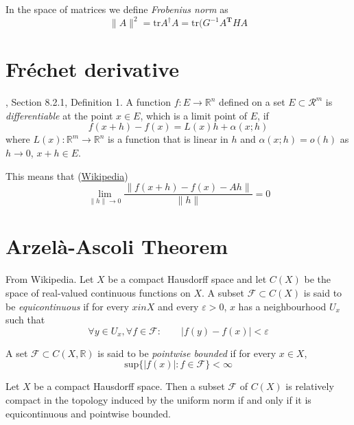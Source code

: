 \begin{definition}
\label{definition-Frobenius-norm}
In the space of matrices we define {\it Frobenius norm} as
\begin{equation}
\label{equation-Frobenius-norm}
\|A\|^2=\text{tr}A^\dag A=\text{tr}(G^{-1}A^{\mathbf{T}}HA
\end{equation}
\end{definition}

\section{Fréchet derivative}
\label{section-Fréchet-derivative}

\begin{definition}
\label{definition-Frechet-derivative}
\cite{zo1}, Section 8.2.1, Definition 1. A function $f:E \to \mathbb{R}^n$
defined on a set $E \subset \mathcal{R}^m$ is {\it differentiable} at the point
$x \in E$, which is a limit point of $E$, if
$$
f(x+h)-f(x)=L(x)h+\alpha(x;h)
$$
where $L(x):\mathbb{R}^m\to \mathbb{R}^n$ is a function that is linear in $h$
and $\alpha(x;h)=o(h)$ as $h\to 0$, $x+h\in E$.
\end{definition}

This means that (\href{Alguém sabe um jeito bom de mostrar A~(1\s) * Id
?}{Wikipedia})
$$
\lim_{\|h\|\to 0} \frac{\|f(x+h)-f(x)-Ah\|}{\|h\|}=0
$$

\section{Arzelà-Ascoli Theorem}
\label{section-Arzela-Ascoli-theorem}
\begin{definition}
\label{definition-equicontinuous}
From Wikipedia. Let $X$ be a compact Hausdorff space and let  $C(X)$ be the
space of real-valued continuous functions on $X$. A subset $\mathcal{F} \subset
C(X)$ is said to be {\it equicontinuous} if for every $x in X$ and every
$\varepsilon>0$, $x$ has a neighbourhood $U_x$ such that
$$
\forall y \in U_x, \forall f \in \mathcal{F}: \qquad |f(y)-f(x)|<\varepsilon
$$
\end{definition}

\begin{definition}
\label{definition-pointwise-bounded}
A set $\mathcal{F}\subset C(X,\mathbb{R})$ is said to be {\it pointwise
bounded} if for every $x \in X$,
$$
\text{sup}\{|f(x)|:f \in \mathcal{F}\}<\infty
$$
\end{definition}

\begin{theorem}
\label{theorem-Arzela-Ascoli}
Let $X$ be a compact Hausdorff space. Then a subset $\mathcal{F}$ of $C(X)$ is
relatively compact in the topology induced by the uniform norm if and only if it
is equicontinuous and pointwise bounded.
\end{theorem}






